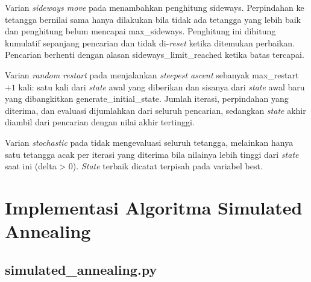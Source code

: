 Varian \textit{sideways move} pada  menambahkan penghitung sideways. Perpindahan ke tetangga bernilai sama hanya dilakukan bila tidak ada tetangga yang lebih baik dan penghitung belum mencapai max\_sideways. Penghitung ini dihitung kumulatif sepanjang pencarian dan tidak di-\textit{reset} ketika ditemukan perbaikan. Pencarian berhenti dengan alasan sideways\_limit\_reached ketika batas tercapai.


Varian \textit{random restart} pada  menjalankan \textit{steepest ascent} sebanyak max\_restart $+ 1$ kali: satu kali dari \textit{state} awal yang diberikan dan sisanya dari \textit{state} awal baru yang dibangkitkan generate\_initial\_state. Jumlah iterasi, perpindahan yang diterima, dan evaluasi dijumlahkan dari seluruh pencarian, sedangkan \textit{state} akhir diambil dari pencarian dengan nilai akhir tertinggi.


Varian \textit{stochastic} pada  tidak mengevaluasi seluruh tetangga, melainkan hanya satu tetangga acak per iterasi yang diterima bila nilainya lebih tinggi dari \textit{state} saat ini (delta > 0). \textit{State} terbaik dicatat terpisah pada variabel best.


\section{Implementasi Algoritma Simulated Annealing}

\subsection{simulated\_annealing.py}

